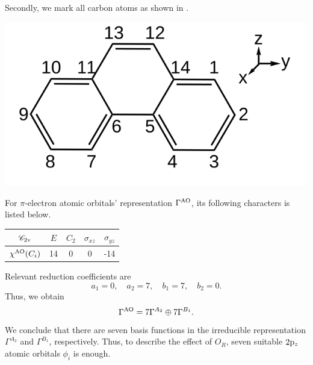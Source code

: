		Secondly, we mark all carbon atoms as shown in .
		\begin{center}
		\includegraphics[scale=1.0]{./structures/exercise_1/phenanthrene/0.png}
		\setlength{\abovecaptionskip}{-0.3em}
		\label{fig:phenanthrene}
		\setlength{\belowcaptionskip}{-0.8em}
		\end{center}				
		
		For $\pi$-electron atomic orbitals' representation $\Gamma^{\rm AO}$, its following characters is listed below.
		\begin{center}
		\setlength{\abovecaptionskip}{-0.3em}
		\begin{tabular}{ccccc}\hline
	$\mathscr{C}_{\rm 2v}$	& $E$ & $C_2$ &	$\sigma_{xz}$	& $\sigma_{yz}$ \\ \hline
	$\chi^{{\rm AO}}(C_i)$	&	14	&	0	&	0	&	-14	\\ \hline
		\end{tabular}\vspace*{-0.5em}
		\end{center}
		Relevant reduction coefficients are
		\begin{equation*}
		a_1 = 0, \quad a_2 = 7, \quad b_1 = 7, \quad b_2 = 0.
		\end{equation*}
		Thus, we obtain
		\begin{equation*}
			\Gamma^{{\rm AO}} = 7\Gamma^{A_2} \oplus 7\Gamma^{B_1}.
		\end{equation*}
		We conclude that there are seven basis functions in the irreducible representation $\Gamma^{A_2}$ and $\Gamma^{B_1}$, respectively. Thus, to describe the effect of $O_R$, seven suitable $2 {\rm p}_z$ atomic orbitals $\phi_i$ is enough.
		
